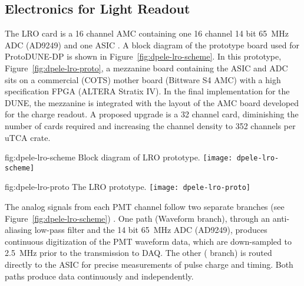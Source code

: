 \subsection{Electronics for Light Readout}
\label{sec:fddp-tpc-elec-design-lro}

%
The LRO card is a \num{16} channel AMC containing one \num{16} channel \num{14} bit \SI{65}{\MHz} ADC (AD9249) and one  ASIC \cite{catiroc}. A block diagram of the prototype board used for ProtoDUNE-DP is shown in Figure~\ref{fig:dpele-lro-scheme}. In this prototype, Figure~\ref{fig:dpele-lro-proto}, a mezzanine board containing the ASIC and ADC sits on a commercial (COTS) mother board (Bittware S4 AMC) with a high specification FPGA (ALTERA Stratix IV). In the final implementation for the DUNE, the mezzanine is integrated with the layout of the AMC board developed for the charge readout.  
A proposed upgrade is a \num{32} channel card, diminishing the number of cards required and increasing the channel density to \num{352} channels per uTCA crate.

\begin{dunefigure}{fig:dpele-lro-scheme}
{Block diagram of LRO prototype.}
\texttt{[image: dpele-lro-scheme]}
\end{dunefigure}

\begin{dunefigure}{fig:dpele-lro-proto}
{The LRO prototype.}
\texttt{[image: dpele-lro-proto]}
\end{dunefigure}

The analog signals from each PMT channel follow two separate branches (see Figure~\ref{fig:dpele-lro-scheme}) . One path (Waveform branch), through an anti-aliasing low-pass filter and the \num{14} bit \SI{65}{\MHz} ADC (AD9249), produces continuous digitization of the PMT waveform data, which are down-sampled to \SI{2.5}{MHz} prior to the transmission to DAQ. The other ( branch) is routed directly to the  ASIC for precise measurements of pulse charge and timing. Both paths produce data continuously and independently.


